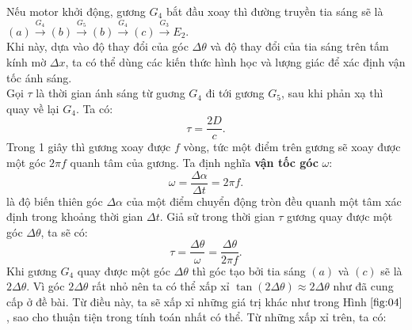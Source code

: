 \begin{enumerate}
    Nếu motor khởi động, gương $G_4$ bắt đầu xoay thì đường truyền tia sáng sẽ là $(a) \xrightarrow{G_4} (b) \xrightarrow{G_5} (b) \xrightarrow{G_4} (c) \xrightarrow{G_3} E_2$. \\
    
    Khi này, dựa vào độ thay đổi của góc $\Delta \theta$ và độ thay đổi của tia sáng trên tấm kính mờ $\Delta x$, ta có thể dùng các kiến thức hình học và lượng giác để xác định vận tốc ánh sáng. \\

    Gọi $\tau$ là thời gian ánh sáng từ guơng $G_4$ đi tới gương $G_5$, sau khi phản xạ thì quay về lại $G_4$. Ta có:
    \begin{equation}
        \tau = \frac{2D}{c}.
        \label{eq:02}
    \end{equation}
    Trong 1 giây thì gương xoay được $f$ vòng, tức một điểm trên gương sẽ xoay được một góc $2 \pi f$ quanh tâm của gương. Ta định nghĩa \textbf{vận tốc góc} $\omega$:
    \begin{equation}
        \omega = \frac{\Delta \alpha}{\Delta t} = 2 \pi f.
    \end{equation}
    là độ biến thiên góc $\Delta \alpha$ của một điểm chuyển động tròn đều quanh một tâm xác định trong khoảng thời gian $\Delta t$. Giả sử trong thời gian $\tau$ gương quay được một góc $\Delta \theta$, ta sẽ có:
    \begin{equation}
        \tau = \frac{\Delta \theta}{\omega} = \frac{\Delta \theta}{2 \pi f}.
        \label{eq:03}
    \end{equation}
    Khi gương $G_4$ quay được một góc $\Delta\theta$ thì góc tạo bởi tia sáng $(a)$ và $(c)$ sẽ là $2 \Delta\theta$. Vì góc $2 \Delta\theta$ rất nhỏ nên ta có thể xấp xỉ $\tan(2 \Delta\theta) \approx 2 \Delta\theta$ như đã cung cấp ở đề bài. Từ điều này, ta sẽ xấp xỉ những giá trị khác như trong Hình $\ref{fig:04}$, sao cho thuận tiện trong tính toán nhất có thể. Từ những xấp xỉ trên, ta có:

    \begin{figure}[!h]
    \centering
    \scalebox{0.9}{
    \begin{tikzpicture}[x=0.75pt,y=0.75pt,yscale=-1,xscale=1]
    
    \draw [color={rgb, 255:red, 245; green, 166; blue, 35 }  ,draw opacity=1 ][fill={rgb, 255:red, 248; green, 231; blue, 28 }  ,fill opacity=1 ][line width=1.5]    (175,172) -- (502.08,73.86) ;
    \draw    (494.17,33.12) -- (509.99,114.6) ;
    \draw    (503.01,31.4) -- (518.83,112.88) ;
    \draw    (503.01,31.4) -- (494.17,33.12) ;
    \draw    (518.83,112.88) -- (509.99,114.6) ;
    

\end{tikzpicture}}
\end{figure}
\end{enumerate}
